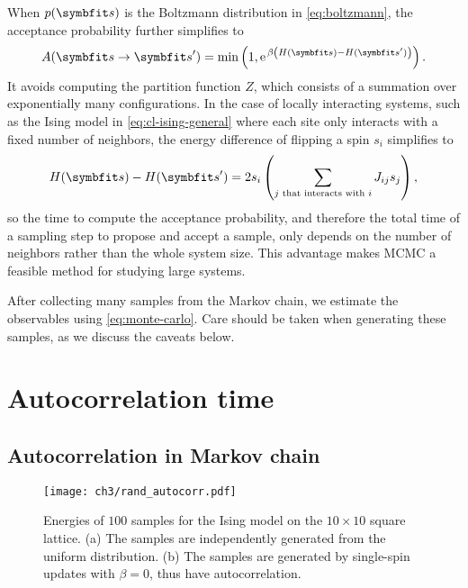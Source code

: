 When $p(\vs)$ is the Boltzmann distribution in \cref{eq:boltzmann}, the acceptance probability further simplifies to
\begin{equation}
A(\vs \to \vs') = \min\left( 1, \rme^{\,\beta \left( H(\vs) - H(\vs') \right)} \right).
\end{equation}
It avoids computing the partition function $Z$, which consists of a summation over exponentially many configurations. In the case of locally interacting systems, such as the Ising model in \cref{eq:cl-ising-general} where each site only interacts with a fixed number of neighbors, the energy difference of flipping a spin $s_i$ simplifies to
\begin{equation}
H(\vs) - H(\vs') = 2 s_i \left( \sum_{\text{$j$ that interacts with $i$}} J_{i j} s_j \right),
\end{equation}
so the time to compute the acceptance probability, and therefore the total time of a sampling step to propose and accept a sample, only depends on the number of neighbors rather than the whole system size. This advantage makes MCMC a feasible method for studying large systems.

After collecting many samples from the Markov chain, we estimate the observables using \cref{eq:monte-carlo}. Care should be taken when generating these samples, as we discuss the caveats below.

\section{Autocorrelation time}
\label{sec:iat}

\subsection{Autocorrelation in Markov chain}

\begin{figure}[htb]
\centering
\texttt{[image: ch3/rand\_autocorr.pdf]}
\caption[Energy of Ising model from independent and autocorrelated samples]{
Energies of $100$ samples for the Ising model on the $10 \times 10$ square lattice.
(a) The samples are independently generated from the uniform distribution.
(b) The samples are generated by single-spin updates with $\beta = 0$, thus have autocorrelation.
}
\label{fig:rand-autocorr}
\end{figure}

